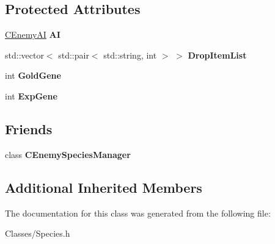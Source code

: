 \subsection*{Protected Attributes}
\begin{DoxyCompactItemize}
\item 
\hyperlink{class_c_enemy_a_i}{C\+Enemy\+AI} {\bfseries AI}\hypertarget{class_c_enemy_species_ab762c44a7e2d33bc3a7137d9f160f654}{}\label{class_c_enemy_species_ab762c44a7e2d33bc3a7137d9f160f654}

\item 
std\+::vector$<$ std\+::pair$<$ std\+::string, int $>$ $>$ {\bfseries Drop\+Item\+List}\hypertarget{class_c_enemy_species_ad24c8add86987bc70da6f2e6790b6851}{}\label{class_c_enemy_species_ad24c8add86987bc70da6f2e6790b6851}

\item 
int {\bfseries Gold\+Gene}\hypertarget{class_c_enemy_species_a31978d7b6ff2e0005e17ae18b52fb609}{}\label{class_c_enemy_species_a31978d7b6ff2e0005e17ae18b52fb609}

\item 
int {\bfseries Exp\+Gene}\hypertarget{class_c_enemy_species_a45710208ef330a71c7924c96ca308fc3}{}\label{class_c_enemy_species_a45710208ef330a71c7924c96ca308fc3}

\end{DoxyCompactItemize}
\subsection*{Friends}
\begin{DoxyCompactItemize}
\item 
class {\bfseries C\+Enemy\+Species\+Manager}\hypertarget{class_c_enemy_species_a0789d2c1309cbdcb1f1095c865b9312e}{}\label{class_c_enemy_species_a0789d2c1309cbdcb1f1095c865b9312e}

\end{DoxyCompactItemize}
\subsection*{Additional Inherited Members}


The documentation for this class was generated from the following file\+:\begin{DoxyCompactItemize}
\item 
Classes/Species.\+h\end{DoxyCompactItemize}
